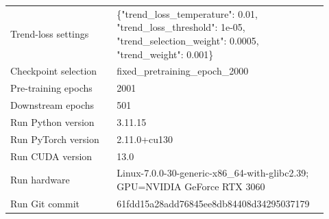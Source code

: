 \begin{table}[p]
\begin{tabular}{p{0.32\linewidth}p{0.60\linewidth}}
Trend-loss settings & \{"trend\_loss\_temperature": 0.01, "trend\_loss\_threshold": 1e-05, "trend\_selection\_weight": 0.0005, "trend\_weight": 0.001\} \\
Checkpoint selection & fixed\_pretraining\_epoch\_2000 \\
Pre-training epochs & 2001 \\
Downstream epochs & 501 \\
Run Python version & 3.11.15 \\
Run PyTorch version & 2.11.0+cu130 \\
Run CUDA version & 13.0 \\
Run hardware & Linux-7.0.0-30-generic-x86\_64-with-glibc2.39; GPU=NVIDIA GeForce RTX 3060 \\
Run Git commit & 61fdd15a28add76845ee8db84408d34295037179 \\
\bottomrule
\end{tabular}
\end{table}
